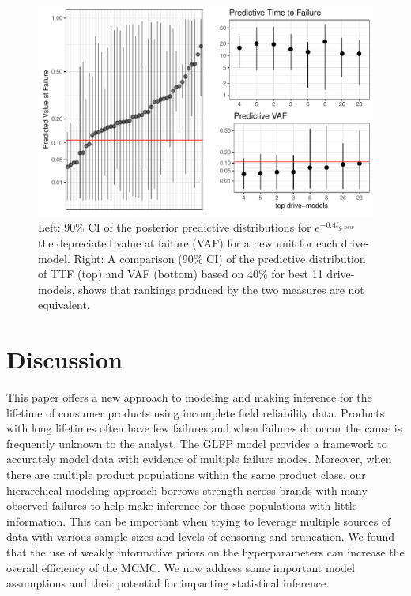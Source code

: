 \documentclass[12pt]{article}
\begin{document}
 
 

\begin{figure}[H]
  \centering
  \includegraphics[width=.8\textwidth]{dm-eval}
  \caption{Left: 90\% CI of the posterior predictive distributions for $e^{-0.4 t_{g,new}}$ the depreciated value at failure (VAF) for a new unit for each drive-model.
  Right: A comparison (90\% CI) of the predictive distribution of TTF (top) and VAF (bottom) based on 40\% for best 11 drive-models, shows that rankings produced by the two measures are not equivalent.}
  \label{fig5}
\end{figure}


\section{Discussion}
\label{sec:Discussion}
This paper offers a new approach to modeling and making inference for the lifetime of consumer products using incomplete field reliability data.  Products with long lifetimes often have few failures and when failures do occur the cause is frequently unknown to the analyst.  The GLFP model provides a framework to accurately model data with evidence of multiple failure modes. Moreover, when there are multiple product populations within the same product class, our hierarchical modeling approach borrows strength across brands with many observed failures to help make inference for those populations with little information.  This can be important when trying to leverage multiple sources of data with various sample sizes and levels of censoring and truncation.  We found that the use of weakly informative priors on the hyperparameters can increase the overall efficiency of the MCMC.  We now address some important model assumptions and their potential for impacting statistical inference. 
\end{document}
